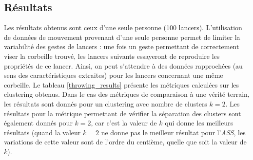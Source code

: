 \subsection{Résultats}
Les résultats obtenus sont ceux d'une seule personne (100 lancers). L'utilisation de données de mouvement provenant d'une seule personne permet de limiter la variabilité des gestes de lancers : une fois un geste permettant de correctement viser la corbeille trouvé, les lancers suivants essayeront de reproduire les propriétés de ce lancer. Ainsi, on peut s'attendre à des données rapprochées (au sens des caractéristiques extraites) pour les lancers concernant une même corbeille. Le tableau \ref{throwing_results} présente les métriques calculées sur les clustering obtenus. Dans le cas des métriques de comparaison à une vérité terrain, les résultats sont donnés pour un clustering avec nombre de clusters $k = 2$. Les résultats pour la métrique permettant de vérifier la séparation des clusters sont également donnés pour $k = 2$, car c'est la valeur de $k$ qui donne les meilleurs résultats (quand la valeur $k = 2$ ne donne pas le meilleur résultat pour l'\textit{ASS}, les variations de cette valeur sont de l'ordre du centième, quelle que soit la valeur de $k$).

